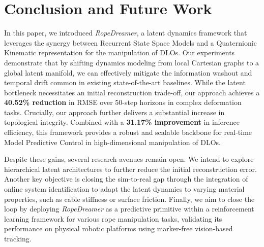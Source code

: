 \documentclass[letterpaper, 10 pt, conference]{ieeeconf}  %
\begin{document}
\section{Conclusion and Future Work}
\label{sec:conclusion}

In this paper, we introduced \textit{RopeDreamer}, a latent dynamics framework that leverages the synergy between Recurrent State Space Models and a Quaternionic Kinematic representation for the manipulation of DLOs. Our experiments demonstrate that by shifting dynamics modeling from local Cartesian graphs to a global latent manifold, we can effectively mitigate the information washout and temporal drift common in existing state-of-the-art baselines. While the latent bottleneck necessitates an initial reconstruction trade-off, our approach achieves a \textbf{40.52\% reduction} in RMSE over 50-step horizons in complex deformation tasks. Crucially, our approach further delivers a substantial increase in topological integrity. Combined with a \textbf{31.17\% improvement} in inference efficiency, this framework provides a robust and scalable backbone for real-time Model Predictive Control in high-dimensional manipulation of DLOs.

Despite these gains, several research avenues remain open. We intend to explore hierarchical latent architectures to further reduce the initial reconstruction error. Another key objective is closing the sim-to-real gap through the integration of online system identification to adapt the latent dynamics to varying material properties, such as cable stiffness or surface friction. Finally, we aim to close the loop by deploying \textit{RopeDreamer} as a predictive primitive within a reinforcement learning framework for various rope manipulation tasks, validating its performance on physical robotic platforms using marker-free vision-based tracking.



\end{document}
